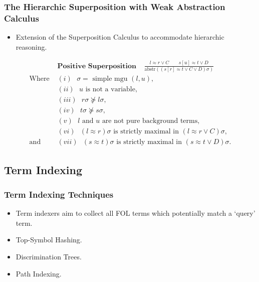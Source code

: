 \documentclass[10pt,xcolor={dvipsnames}]{beamer}
\newcommand{\HSWAC}{Hierarchic Superposition with Weak Abstraction Calculus}
\begin{document}
\begin{NoHyper}
\begin{frame}
  \frametitle{The \HSWAC}
  \begin{itemize}
  \item<1-> Extension of the Superposition Calculus to accommodate hierarchic reasoning.
  \end{itemize}
  \begin{align*}
&\textbf{Positive Superposition}\ \ \ \ \  \frac{l \approx r \lor C\quad \quad s[u] \approx t \lor D}{\text{abstr}((s[r] \approx t \lor C \lor D)\sigma)}\\
\text{Where } &(i) \text{ $\sigma = $ simple mgu $(l,u)$,}\\
&(ii) \text{ $u$ is not a variable,}\\
&(iii) \text{ $r\sigma \not\succeq l\sigma$,}\\
&(iv) \text{ $t\sigma \not\succeq s\sigma$,}\\
&(v) \text{ $l$ and $u$ are not pure background terms,}\\
&(vi) \text{ $(l \approx r)\sigma$ is strictly maximal in $(l \approx r \lor C)\sigma$,}\\
\text{and } &(vii) \text{ $(s \approx t)\sigma$ is strictly maximal in $(s \approx t \lor D)\sigma$.}
\end{align*}
\end{frame}

\subsection{Term Indexing} 
\begin{frame}
  \frametitle{Term Indexing Techniques}
  \begin{itemize}
  \item<1-> Term indexers aim to collect all FOL terms which potentially match a `query' term.
  \item<2-> Top-Symbol Hashing.
  \item<2-> Discrimination Trees.
  \item<2-> Path Indexing.
  \end{itemize}
\end{frame}


\end{NoHyper}
\end{document}
